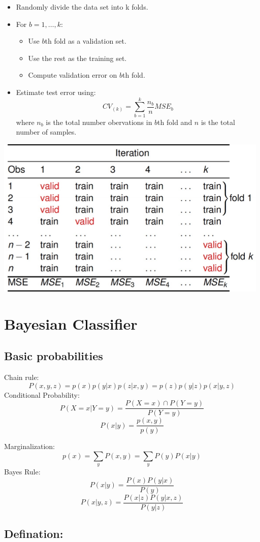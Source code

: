 \documentclass[letterpaper,12pt]{article}
\begin{document}
\begin{itemize}
    \item Randomly divide the data set into k folds.
    \item For $b = 1,\ldots,k:$
          \begin{itemize}
              \item Use $b$th fold as a validation set.
              \item Use the rest as the training set.
              \item Compute validation error on $b$th fold.
          \end{itemize}
    \item Estimate test error using:
          \[
              CV_{(k)}=\sum_{b=1}^{k}\frac{n_b}{n}MSE_b
          \]
          where $n_b$ is the total number obervations in $b$th fold and $n$ is the total
          number of samples.
\end{itemize}
\includegraphics{./Image/K fold Cross-Validation.png}

\section{Bayesian Classifier}
\subsection{Basic probabilities}
Chain rule:
\[
    P(x,y,z) = p(x)p(y|x)p(z|x,y) = p(z)p(y|z)p(x|y,z)
\]
Conditional Probability:
\[
    P(X=x|Y=y)=\frac{P(X=x)\cap P(Y=y)}{P(Y=y)}
\]
\[
    P(x|y)=\frac{p(x,y)}{p(y)}
\]

Marginalization:
\[
    p(x)=\sum_{y}P(x,y)=\sum_{y}P(y)P(x|y)
\]
Bayes Rule:
\[
    P(x|y)=\frac{P(x)P(y|x)}{P(y)}
\]
\[
    P(x|y,z)=\frac{P(x|z)P(y|x,z)}{P(y|z)}
\]
\subsection{Defination:}
\end{document}
